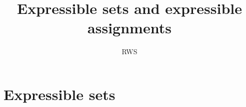 \documentclass[aps,english,superscriptaddress,onecolumn,twoside,longbibliography,pra,floatfix,fleqn,nofootinbib]{revtex4-1}%
\theoremstyle{definition}
\begin{document}
\title{Expressible sets and expressible assignments}

\author{RWS}


\maketitle

\section{Expressible sets}
\end{document}
